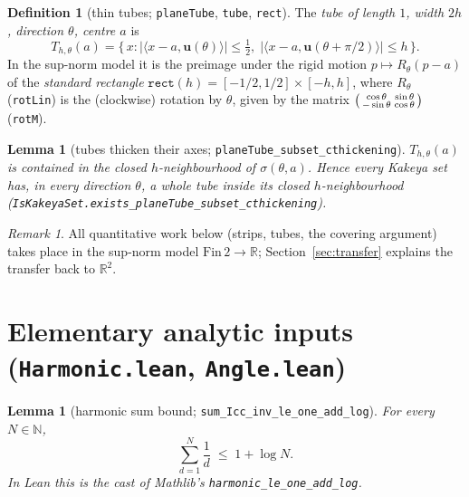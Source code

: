 \documentclass[11pt,a4paper]{article}
\newcommand{\R}{\mathbb{R}}
\newcommand{\N}{\mathbb{N}}
\newcommand{\Plane}{\ensuremath{\mathbb{R}^{2}}}     %
\newcommand{\FinTwo}{\ensuremath{\mathrm{Fin}\,2 \to \R}}
\newcommand{\dir}{\mathbf{u}}                        %
\newcommand{\tseg}{\sigma}                           %
\newcommand{\tube}{T}                                %
\newcommand{\lname}[1]{\texttt{#1}}                  %
\newcommand{\lb}{\_\allowbreak}                      %
\newtheorem{lemma}[theorem]{Lemma}
\theoremstyle{definition}
\newtheorem{definition}[theorem]{Definition}
\theoremstyle{remark}
\newtheorem{remark}[theorem]{Remark}
\begin{document}
\begin{definition}[{thin tubes; \lname{planeTube}, \lname{tube}, \lname{rect}}]
The \emph{tube of length $1$, width $2h$, direction $\theta$, centre $a$} is
\[
  \tube_{h,\theta}(a)
  = \{\, x : |\langle x-a,\dir(\theta)\rangle|\le \tfrac12,\;
             |\langle x-a,\dir(\theta+\pi/2)\rangle|\le h \,\}.
\]
In the sup-norm model it is the preimage under the rigid motion
$p\mapsto R_\theta(p-a)$ of the \emph{standard rectangle}
$\lname{rect}(h) = [-1/2,1/2]\times[-h,h]$, where $R_\theta$
(\lname{rotLin}) is the (clockwise) rotation by $\theta$, given by the matrix
$\begin{psmallmatrix}\cos\theta & \sin\theta\\ -\sin\theta & \cos\theta\end{psmallmatrix}$
(\lname{rotM}).
\end{definition}

\begin{lemma}[{tubes thicken their axes; \lname{planeTube\_subset\_cthickening}}]
\label{lem:tube-thicken}
$\tube_{h,\theta}(a)$ is contained in the closed $h$-neighbourhood of $\tseg(\theta,a)$.
Hence every Kakeya set has, in every direction $\theta$, a whole tube inside its closed
$h$-neighbourhood
(\lname{IsKakeyaSet.exists\lb planeTube\lb subset\lb cthickening}).
\end{lemma}

\begin{remark}
All quantitative work below (strips, tubes, the covering argument) takes place in the
sup-norm model $\FinTwo$; Section~\ref{sec:transfer} explains the transfer back to
$\Plane$.
\end{remark}

\section{Elementary analytic inputs (\lname{Harmonic.lean}, \lname{Angle.lean})}

\begin{lemma}[{harmonic sum bound; \lname{sum\_Icc\_inv\_le\_one\_add\_log}}]
For every $N\in\N$,
\[
  \sum_{d=1}^{N} \frac{1}{d} \;\le\; 1 + \log N .
\]
\emph{In Lean this is the cast of Mathlib's \lname{harmonic\_le\_one\_add\_log}.}
\end{lemma}
\end{document}
